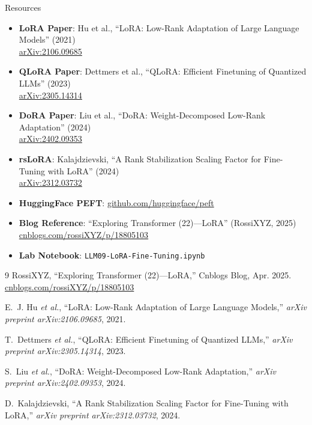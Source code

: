 \documentclass[aspectratio=169,10pt]{beamer}
\begin{document}
\begin{frame}{Resources}
	\begin{itemize}
		\item \textbf{LoRA Paper}: Hu et al., ``LoRA: Low-Rank Adaptation of Large Language Models'' (2021) \\
		      \href{https://arxiv.org/abs/2106.09685}{arXiv:2106.09685}

		\item \textbf{QLoRA Paper}: Dettmers et al., ``QLoRA: Efficient Finetuning of Quantized LLMs'' (2023) \\
		      \href{https://arxiv.org/abs/2305.14314}{arXiv:2305.14314}

		\item \textbf{DoRA Paper}: Liu et al., ``DoRA: Weight-Decomposed Low-Rank Adaptation'' (2024) \\
		      \href{https://arxiv.org/abs/2402.09353}{arXiv:2402.09353}

		\item \textbf{rsLoRA}: Kalajdzievski, ``A Rank Stabilization Scaling Factor for Fine-Tuning with LoRA'' (2024) \\
		      \href{https://arxiv.org/abs/2312.03732}{arXiv:2312.03732}

		\item \textbf{HuggingFace PEFT}: \href{https://github.com/huggingface/peft}{github.com/huggingface/peft}

		\item \textbf{Blog Reference}: ``Exploring Transformer (22)---LoRA'' (RossiXYZ, 2025) \\
		      \href{https://www.cnblogs.com/rossiXYZ/p/18805103}{cnblogs.com/rossiXYZ/p/18805103}

		\item \textbf{Lab Notebook}: \texttt{LLM09-LoRA-Fine-Tuning.ipynb}
	\end{itemize}
\end{frame}

\begin{thebibliography}{9}
	RossiXYZ, ``Exploring Transformer (22)---LoRA,'' Cnblogs Blog, Apr. 2025.
	\href{https://www.cnblogs.com/rossiXYZ/p/18805103}{cnblogs.com/rossiXYZ/p/18805103}

	E.~J. Hu \emph{et al.}, ``LoRA: Low-Rank Adaptation of Large Language Models,'' \emph{arXiv preprint arXiv:2106.09685}, 2021.

	T.~Dettmers \emph{et al.}, ``QLoRA: Efficient Finetuning of Quantized LLMs,'' \emph{arXiv preprint arXiv:2305.14314}, 2023.

	S.~Liu \emph{et al.}, ``DoRA: Weight-Decomposed Low-Rank Adaptation,'' \emph{arXiv preprint arXiv:2402.09353}, 2024.

	D.~Kalajdzievski, ``A Rank Stabilization Scaling Factor for Fine-Tuning with LoRA,'' \emph{arXiv preprint arXiv:2312.03732}, 2024.
\end{thebibliography}
\end{document}
